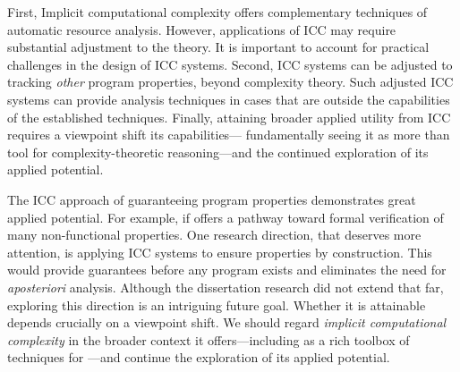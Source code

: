 First, Implicit computational complexity offers complementary techniques of
automatic resource analysis. However, applications of ICC may require
substantial adjustment to the theory. It is important to account for practical
challenges in the design of ICC systems. Second, ICC systems can be adjusted to
tracking \emph{other} program properties, beyond complexity theory. Such
adjusted ICC systems can provide analysis techniques in cases that are outside
the capabilities of the established techniques. Finally, attaining broader
applied utility from ICC requires a viewpoint shift \wrt its capabilities---\ie
fundamentally seeing it as more than tool for complexity-theoretic
reasoning---and the continued exploration of its applied potential.

The ICC approach of guaranteeing program properties demonstrates great applied
potential. For example, if offers a pathway toward formal verification of many
non-functional properties. One research
direction, that deserves more attention, is applying ICC systems to ensure
properties by construction. This would provide guarantees before any program
exists and eliminates the need for \emph{aposteriori} analysis. Although the
dissertation research did not extend that far, exploring this direction is an
intriguing future goal. Whether it is attainable depends crucially on a
viewpoint shift. We should regard \emph{implicit computational complexity} in
the broader context it offers---including as a rich toolbox of techniques for
---and continue the exploration of its applied
potential.


